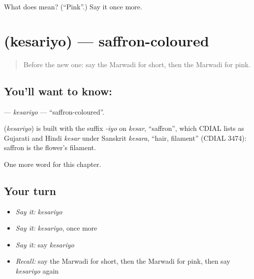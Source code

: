 \begin{tcolorbox}[breakable,colback=teal!4,colframe=teal!35!black,title={Before you move on}]
What does  mean? (\textquotedblleft{}Pink\textquotedblright{}.) Say it once more.
\end{tcolorbox}
\section[\texorpdfstring{\mw{केसरियो} (kesariyo)}{केसरियो (kesariyo)}]{ (kesariyo) — saffron-coloured}

\label{lesson:MW-C145-kesariyo}



\begin{quote}
Before the new one: say the Marwadi for short, then the Marwadi for pink.
\end{quote}

\subsection*{You'll want to know: }
\textbf{} — \emph{kesariyo} — \textquotedblleft{}saffron-coloured\textquotedblright{}.

\begin{cousinweb}
\textbf{} (\emph{kesariyo}) is built with the suffix \emph{-iyo} on \emph{kesar}, \textquotedblleft{}saffron\textquotedblright{}, which CDIAL lists as Gujarati and Hindi \emph{kesar} under Sanskrit \emph{kesara}, \textquotedblleft{}hair, filament\textquotedblright{} (CDIAL 3474): saffron is the flower's filament.
\end{cousinweb}

\begin{grammarlens}[title={What you've built}]
One more word for this chapter.
\end{grammarlens}

\subsection*{Your turn}
\begin{itemize}
\raggedright
  \item \emph{Say it:} \emph{kesariyo}
  \item \emph{Say it:} \emph{kesariyo}, once more
  \item \emph{Say it:} say \emph{kesariyo}
  \item \emph{Recall:} say the Marwadi for short, then the Marwadi for pink, then say \emph{kesariyo} again
\end{itemize}

